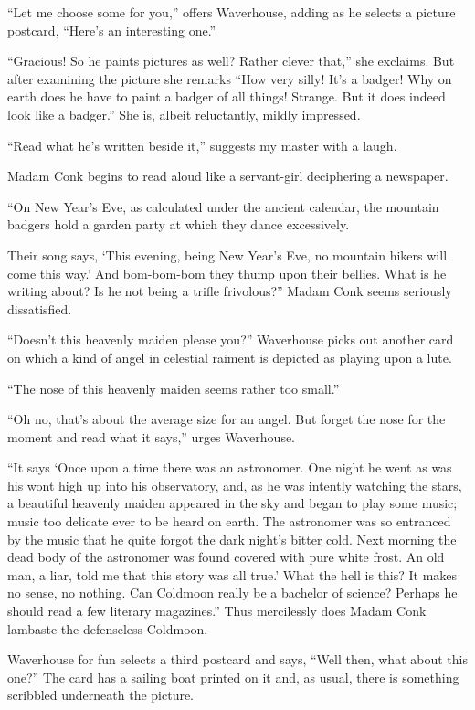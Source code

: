 \documentclass[12pt, openright]{book}
\begin{document}
``Let me choose some for you,'' offers Waverhouse, adding as he selects
a picture postcard, ``Here's an interesting one.''

``Gracious! So he paints pictures as well? Rather clever that,'' she
exclaims. But after examining the picture she remarks ``How very silly!
It's a badger! Why on earth does he have to paint a badger of all
things! Strange. But it does indeed look like a badger.'' She is, albeit
reluctantly, mildly impressed.

``Read what he's written beside it,'' suggests my master with a laugh.

Madam Conk begins to read aloud like a servant-girl deciphering a
newspaper.

``On New Year's Eve, as calculated under the ancient calendar, the
mountain badgers hold a garden party at which they dance excessively.

Their song says, `This evening, being New Year's Eve, no mountain hikers
will come this way.' And bom-bom-bom they thump upon their bellies. What
is he writing about? Is he not being a trifle frivolous?'' Madam Conk
seems seriously dissatisfied.

``Doesn't this heavenly maiden please you?'' Waverhouse picks out
another card on which a kind of angel in celestial raiment is depicted
as playing upon a lute.

``The nose of this heavenly maiden seems rather too small.''

``Oh no, that's about the average size for an angel. But forget the nose
for the moment and read what it says,'' urges Waverhouse.

``It says `Once upon a time there was an astronomer. One night he went
as was his wont high up into his observatory, and, as he was intently
watching the stars, a beautiful heavenly maiden appeared in the sky and
began to play some music; music too delicate ever to be heard on earth.
The astronomer was so entranced by the music that he quite forgot the
dark night's bitter cold. Next morning the dead body of the astronomer
was found covered with pure white frost. An old man, a liar, told me
that this story was all true.' What the hell is this? It makes no sense,
no nothing. Can Coldmoon really be a bachelor of science? Perhaps he
should read a few literary magazines.'' Thus mercilessly does Madam Conk
lambaste the defenseless Coldmoon.

Waverhouse for fun selects a third postcard and says, ``Well then, what
about this one?'' The card has a sailing boat printed on it and, as
usual, there is something scribbled underneath the picture.
\end{document}

